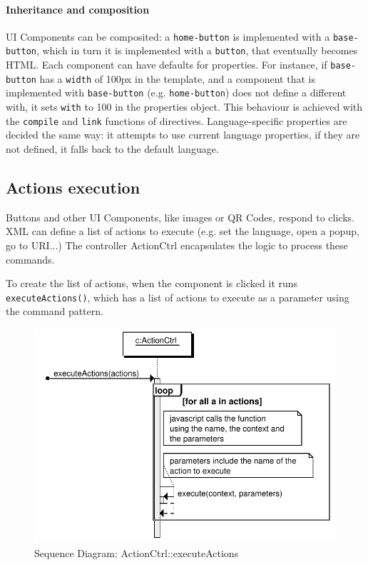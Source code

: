 \paragraph{Inheritance and composition} UI Components can be composited: a \texttt{home-button} is implemented with a \texttt{base-button}, which in turn it is implemented with a \texttt{button}, that eventually becomes \ac{HTML}.
Each component can have defaults for properties.
For instance, if \texttt{base-button} has a \texttt{width} of 100px in the template, and a component that is implemented with \texttt{base-button} (e.g. \texttt{home-button}) does not define a different with, it sets \texttt{with} to 100 in the properties object.
This behaviour is achieved with the \texttt{compile} and \texttt{link} functions of directives.
Language-specific properties are decided the same way: it attempts to use current language properties, if they are not defined, it falls back to the default language.

\subsection{Actions execution}
Buttons and other UI Components, like images or QR Codes, respond to clicks.
\ac{XML} can define a list of actions to execute (e.g. set the language, open a popup, go to \ac{URI}...)
The controller ActionCtrl encapsulates the logic to process these commands.





To create the list of actions, when the component is clicked it runs \lstinline$executeActions()$, which has a list of actions to execute as a parameter using the command pattern.

\begin{figure}[htb]
    \centering
    \includegraphics{figures/design/seqdia/actionCtrl-executeActions.pdf}
    \caption{Sequence Diagram: ActionCtrl::executeActions}
    \label{fig:design-seqdia-actionCtrl-executeActions}
\end{figure}

